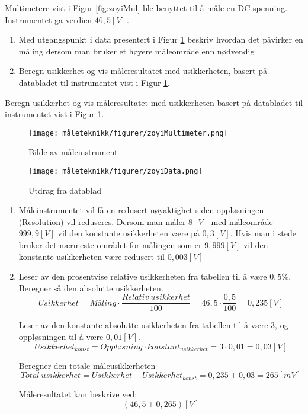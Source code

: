 \begin{question}[name=Oppgave, topic=måleusikkerhet]
Multimetere vist i Figur \ref{fig:zoyiMul} ble benyttet til å måle en DC-spenning. Instrumentet ga verdien $46,5 [V]$.
	\begin{enumerate}[label=\roman*)]
		\item Med utgangspunkt i data presentert i Figur \ref{fig:zoyiDat} beskriv hvordan det påvirker en måling dersom man bruker et høyere måleområde enn nødvendig
		\item Beregn usikkerhet og vis måleresultatet med usikkerheten, basert på databladet til instrumentet vist i Figur \ref{fig:zoyiDat}.
	\end{enumerate}
Beregn usikkerhet og vis måleresultatet med usikkerheten basert på databladet til instrumentet vist i Figur \ref{fig:zoyiDat}.

	\begin{figure}[H]
		\begin{minipage}[c]{0.45\linewidth}
			\texttt{[image: måleteknikk/figurer/zoyiMultimeter.png]}
			\caption{Bilde av måleinstrument}
			\label{fig:zoyiMul}
		\end{minipage}
		\hfill
		\begin{minipage}[c]{0.45\linewidth}
			\texttt{[image: måleteknikk/figurer/zoyiData.png]}
			\caption{Utdrag fra datablad}
			\label{fig:zoyiDat}
		\end{minipage}
	\end{figure}

\end{question}
\vspace{0.5cm} %

\begin{solution}[name=Løsningsforslag oppgave]
	\begin{enumerate}[label=\roman*)]
	\item Måleinstrumentet vil få en redusert nøyaktighet siden oppløsningen (Resolution) vil reduseres. Dersom man måler $8 [V]$ med måleområde $999,9 [V]$ vil den konstante usikkerheten være på $0,3 [V]$. Hvis man i stede bruker det nærmeste området for målingen som er $9,999 [V]$ vil den konstante usikkerheten være redusert til $0,003 [V]$

	\item Leser av den prosentvise relative usikkerheten fra tabellen til å være $0,5 \%$. Beregner så den absolutte usikkerheten.
	\[Usikkerhet = M\text{å}ling \cdot \frac{Relativ\ usikkerhet}{100}=46,5 \cdot \frac{0,5}{100}=0,235[V]\]

	Leser av den konstante absolutte usikkerheten fra tabellen til å være $3$, og oppløsningen til å være $0,01[V]$.
	\[Usikkerhet_{konst}= Oppløsning \cdot konstant_{usikkerhet} = 3 \cdot 0,01 = 0,03 [V]\]

	Beregner den totale måleusikkerheten
	\[Total\ usikkerhet = Usikkerhet + Usikkerhet_{konst}=0,235+0,03=265 [mV]\]

	Måleresultatet kan beskrive ved:
	\[(46,5 \pm 0,265) [V]\]


\end{enumerate}


\end{solution}
